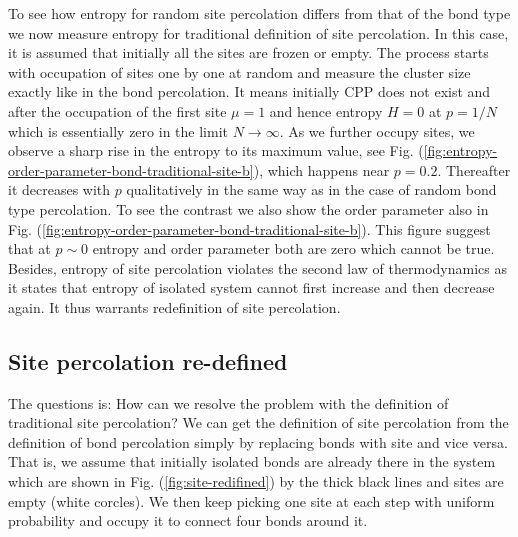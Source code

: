 	
	
	
	
	To see how entropy for random site percolation 
	differs from that of the bond type we now measure entropy for traditional definition of site percolation. In this case,
	it is assumed that initially all the sites are frozen or empty.
	The process starts with occupation of sites one by one at random and measure
	the cluster size exactly like in the bond percolation.
	It means initially CPP does not exist and after the occupation of the first site $\mu=1$ 
	and hence entropy $H=0$ at $p=1/N$ which is essentially zero
	in the limit $N\rightarrow \infty$.
	As we further occupy sites, we observe a sharp rise in the entropy to its maximum value, 
	see Fig. (\ref{fig:entropy-order-parameter-bond-traditional-site-b}), which happens near $p=0.2$. Thereafter it decreases 
	with $p$ qualitatively in the same way as in the case of random bond type percolation. To see the
	contrast we also show the order parameter also in Fig. (\ref{fig:entropy-order-parameter-bond-traditional-site-b}). This figure
	suggest that at $p\sim 0$ entropy and order parameter  both 
	are zero which cannot be true. Besides, entropy of site percolation violates
	the second law of thermodynamics as it states that entropy of isolated system cannot first
	increase and then decrease again. It thus warrants redefinition of site percolation. 
	
	

	
	
	
	\subsection{Site percolation re-defined}
	
	The questions is: How can we resolve the problem with the definition of traditional site percolation?
	We can get the definition of site percolation
	from the definition of bond percolation simply by replacing bonds with site and vice versa.
	That is, we assume that initially isolated bonds are already
	there in the system which are shown in Fig. (\ref{fig:site-redifined}) by the thick black lines and sites
	are empty (white corcles). We then keep picking one site at each step with uniform probability
	and occupy it to connect four bonds around it.  
	
